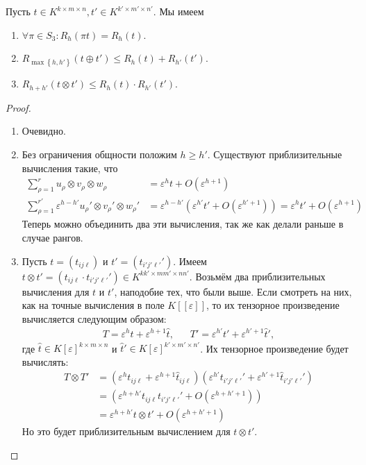 \begin{theorem}\label{th:bi:5.3}
  Пусть $t \in K^{k \times m \times n}, t' \in K^{k' \times m' \times n'}$. Мы имеем
  \begin{enumerate}
       \item $\forall \pi \in S_3: R_h(\pi t) = R_h(t)$.\label{itm:1:th:bi:5.3}
       \item $R_{\max \left\{ h, h' \right\}}(t \oplus t') \leq R_h(t) + R_{h'}(t')$.\label{itm:2:th:bi:5.3}
       \item $R_{h+h'}(t \otimes t') \leq R_{h}(t) \cdot R_{h'}(t')$.\label{itm:3:th:bi:5.3}
  \end{enumerate} 
\end{theorem}
\begin{proof}\ 
  \begin{enumerate}
       \item Очевидно.
       \item Без ограничения общности положим $h \geq h'$. Существуют приблизительные вычисления такие, что
       \begin{align*}
         \sum_{\rho=1}^r u_{\rho} \otimes v_{\rho}  \otimes w_{\rho} & = \varepsilon^h t + O(\varepsilon^{h+1}) \\
         \sum_{\rho=1}^{r'} \varepsilon^{h-h'} u_{\rho}' \otimes v_{\rho}'  \otimes w_{\rho}' & = \varepsilon^{h-h'}\left( \varepsilon^{h'} t' + O(\varepsilon^{h' + 1}) \right) = \varepsilon^h t' + O(\varepsilon^{h+1})
       \end{align*}
       Теперь можно объединить два эти вычисления, так же как делали раньше в случае рангов.
       \item Пусть $t=(t_{ij \ell})$ и $t'=(t_{i' j' \ell'}')$. Имеем $t \otimes t' = (t_{i j \ell} \cdot t_{i' j' \ell'}') \in K^{k k' \times m m' \times n n'}$. Возьмём два приблизительных вычисления для $t$ и $t'$, наподобие тех, что были выше. Если смотреть на них, как на точные вычисления в поле $K[[\varepsilon]]$, то их тензорное произведение вычисляется следующим образом:
       \begin{align*}
         T = \varepsilon^h t + \varepsilon^{h+1} \widehat{t}, &\;\;\;  T' = \varepsilon^{h'} t' + \varepsilon^{h' + 1} \widehat{t}',
       \end{align*}
       где $\widehat{t} \in K[\varepsilon]^{k \times m \times n}$ и $\widehat{t}' \in K[\varepsilon]^{k' \times m' \times n'}$. Их тензорное произведение будет вычислять:
       \begin{align*}
         T \otimes T' & = (\varepsilon^h t_{ij \ell} + \varepsilon^{h+1} \widehat{t}_{ij \ell})(\varepsilon^{h'} t_{i'j'\ell'}' + \varepsilon^{h' + 1}\widehat{t}_{i'j'\ell'}')\\
         & = (\varepsilon^{h+h'}t_{ij \ell} t_{i'j'\ell'}' + O(\varepsilon^{h+h'+1}))\\
         & = \varepsilon^{h+h'} t \otimes t' + O(\varepsilon^{h + h' + 1})
       \end{align*}
       Но это будет приблизительным вычислением для $t \otimes t'$. \qedhere
  \end{enumerate}
\end{proof}

